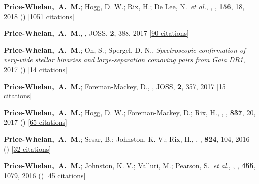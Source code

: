 \item[{\color{deemph}\scriptsize12}]\textbf{Price-Whelan,~A.~M.}; Hogg, D. W.; Rix, H.; De Lee, N.~\textit{et al.}, , \aj, \textbf{156}, 18, 2018 () [\href{http://adsabs.harvard.edu/abs/2018AJ....156...18P}{1051 citations}]

\item[{\color{deemph}\scriptsize11}]\textbf{Price-Whelan,~A.~M.}, , JOSS, \textbf{2}, 388, 2017 [\href{http://adsabs.harvard.edu/abs/2017JOSS....2..388P}{90 citations}]

\item[{\color{deemph}\scriptsize10}]\textbf{Price-Whelan,~A.~M.}; Oh, S.; Spergel, D. N., \textit{Spectroscopic confirmation of very-wide stellar binaries and large-separation comoving pairs from Gaia DR1}, 2017 () [\href{http://adsabs.harvard.edu/abs/2017arXiv170903532P}{14 citations}]

\item[{\color{deemph}\scriptsize9}]\textbf{Price-Whelan,~A.~M.}; Foreman-Mackey, D., , JOSS, \textbf{2}, 357, 2017 [\href{http://adsabs.harvard.edu/abs/2017JOSS....2..357P}{15 citations}]

\item[{\color{deemph}\scriptsize8}]\textbf{Price-Whelan,~A.~M.}; Hogg, D. W.; Foreman-Mackey, D.; Rix, H., , \apj, \textbf{837}, 20, 2017 () [\href{http://adsabs.harvard.edu/abs/2017ApJ...837...20P}{65 citations}]

\item[{\color{deemph}\scriptsize7}]\textbf{Price-Whelan,~A.~M.}; Sesar, B.; Johnston, K. V.; Rix, H., , \apj, \textbf{824}, 104, 2016 () [\href{http://adsabs.harvard.edu/abs/2016ApJ...824..104P}{32 citations}]

\item[{\color{deemph}\scriptsize6}]\textbf{Price-Whelan,~A.~M.}; Johnston, K. V.; Valluri, M.; Pearson, S.~\textit{et al.}, , \mnras, \textbf{455}, 1079, 2016 () [\href{http://adsabs.harvard.edu/abs/2016MNRAS.455.1079P}{45 citations}]

